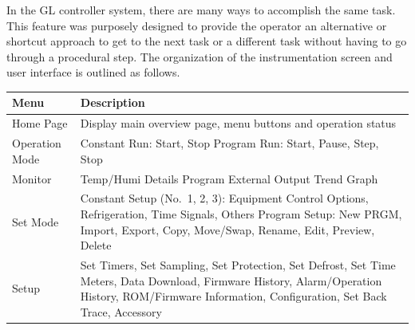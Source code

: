 In the GL controller system, there are many ways to accomplish the same
task. This feature was purposely designed to provide the operator an
alternative or shortcut approach to get to the next task or a different
task without having to go through a procedural step. The organization of
the instrumentation screen and user interface is outlined as follows.

\begin{longtable}[]{@{}ll@{}}
\toprule
\begin{minipage}[b]{0.13\columnwidth}\raggedright
Menu\strut
\end{minipage} & \begin{minipage}[b]{0.81\columnwidth}\raggedright
Description\strut
\end{minipage}\tabularnewline
\midrule
\endhead
\begin{minipage}[t]{0.13\columnwidth}\raggedright
Home Page\strut
\end{minipage} & \begin{minipage}[t]{0.81\columnwidth}\raggedright
Display main overview page, menu buttons and operation status\strut
\end{minipage}\tabularnewline
\begin{minipage}[t]{0.13\columnwidth}\raggedright
Operation Mode\strut
\end{minipage} & \begin{minipage}[t]{0.81\columnwidth}\raggedright
Constant Run: Start, Stop Program Run: Start, Pause, Step, Stop\strut
\end{minipage}\tabularnewline
\begin{minipage}[t]{0.13\columnwidth}\raggedright
Monitor\strut
\end{minipage} & \begin{minipage}[t]{0.81\columnwidth}\raggedright
Temp/Humi Details Program External Output Trend Graph\strut
\end{minipage}\tabularnewline
\begin{minipage}[t]{0.13\columnwidth}\raggedright
Set Mode\strut
\end{minipage} & \begin{minipage}[t]{0.81\columnwidth}\raggedright
Constant Setup (No.~1, 2, 3): Equipment Control Options, Refrigeration,
Time Signals, Others Program Setup: New PRGM, Import, Export, Copy,
Move/Swap, Rename, Edit, Preview, Delete\strut
\end{minipage}\tabularnewline
\begin{minipage}[t]{0.13\columnwidth}\raggedright
Setup\strut
\end{minipage} & \begin{minipage}[t]{0.81\columnwidth}\raggedright
Set Timers, Set Sampling, Set Protection, Set Defrost, Set Time Meters,
Data Download, Firmware History, Alarm/Operation History, ROM/Firmware
Information, Configuration, Set Back Trace, Accessory\strut
\end{minipage}\tabularnewline
\bottomrule
\end{longtable}

